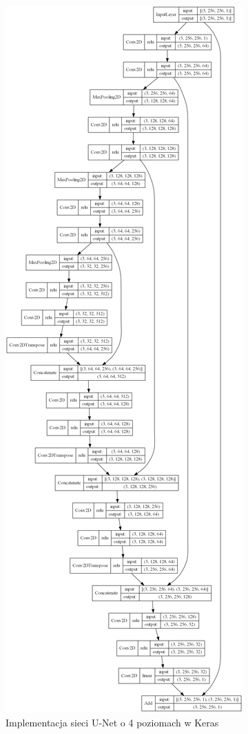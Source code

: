 \documentclass[a4paper, 12pt]{article}
\begin{document}
\begin{figure}[h!]
\begin{center}
	\includegraphics[height=0.95\paperheight]{model_plot.png}
	\caption{Implementacja sieci U-Net o 4 poziomach w Keras}
\end{center}
\end{figure}
\end{document}
